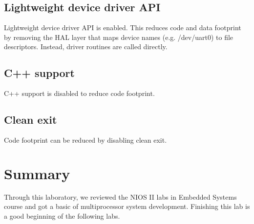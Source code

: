 \documentclass[conference]{IEEEtran}
\begin{document}
\subsection{Lightweight device driver API}
Lightweight device driver API is enabled. This reduces code and data footprint by removing the HAL layer that maps device names (e.g. /dev/uart0) to file descriptors. Instead, driver routines are called directly.
\subsection{C++ support}
C++ support is disabled to reduce code footprint.
\subsection{Clean exit}
Code footprint can be reduced by disabling clean exit.
\section{Summary}
Through this laboratory, we reviewed the NIOS II labs in Embedded Systems course and got a basic of multiprocessor system development. Finishing this lab is a good beginning of the following labs.

%
%

\end{document}
